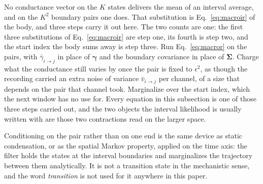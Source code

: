\begin{appendixbox}
No conductance vector on the $K$ states delivers the mean of an interval average, and on the
$K^2$ boundary pairs one does. That substitution is Eq.~\ref{eq:macroir} of the body, and three
steps carry it out here. The two counts are one: the first three substitutions of
Eq.~\ref{eq:macroir} are step one, its fourth is step two, and the start index the body sums away
is step three.
Run Eq.~\ref{eq:macror} on the pairs, with $\bar{\gamma}_{i\to j}$ in place of
$\bm{\gamma}$ and the boundary covariance in place of $\bm{\Sigma}$. Charge what the
conductance still varies by once the pair is fixed to $\epsilon^2$, as though the recording
carried an extra noise of variance $\bar{v}_{i\to j}$ per channel, of a size that
depends on the pair that channel took. Marginalize over the start index, which the next window
has no use for. Every equation in this subsection is one of those three steps carried out, and
the two objects the interval likelihood is usually written with are those two contractions
read on the larger space.

Conditioning on the pair rather than on one end is the same device as static condensation, or as
the spatial Markov property, applied on the time axis: the filter holds the states at the interval
boundaries and marginalizes the trajectory between them analytically. It is not a transition state
in the mechanistic sense, and the word \emph{transition} is not used for it anywhere in this paper.


\end{appendixbox}

